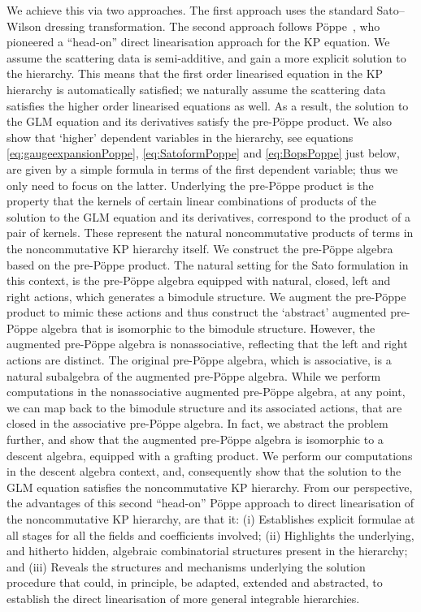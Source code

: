 \documentclass[5p,twocolumn]{elsarticle}
\begin{document}
We achieve this via two approaches. The first approach uses the standard Sato--Wilson dressing transformation.
The second approach follows P\"oppe~\cite{PKP}, who pioneered a ``head-on'' direct linearisation approach for the KP equation.
We assume the scattering data is semi-additive, and gain a more explicit solution to the hierarchy.
This means that the first order linearised equation in the KP hierarchy is automatically satisfied; we naturally assume the scattering data satisfies the higher order linearised equations as well. 
As a result, the solution to the GLM equation and its derivatives satisfy the pre-P\"oppe product.
We also show that `higher' dependent variables in the hierarchy,
see equations \eqref{eq:gaugeexpansionPoppe}, \eqref{eq:SatoformPoppe} and \eqref{eq:BopsPoppe} just below,
are given by a simple formula in terms of the first dependent variable; thus we only need to focus on the latter.
Underlying the pre-P\"oppe product is the property that the kernels of certain linear combinations of products of the solution to the GLM equation and its derivatives,
correspond to the product of a pair of kernels.
These represent the natural noncommutative products of terms in the noncommutative KP hierarchy itself.
We construct the pre-P\"oppe algebra based on the pre-P\"oppe product.
The natural setting for the Sato formulation in this context, is the pre-P\"oppe algebra equipped with natural, closed, left and right actions, which generates a bimodule structure.
We augment the pre-P\"oppe product to mimic these actions and thus construct the `abstract' augmented pre-P\"oppe algebra that is isomorphic to the bimodule structure.
However, the augmented pre-P\"oppe algebra is nonassociative, reflecting that the left and right actions are distinct.
The original pre-P\"oppe algebra, which is associative, is a natural subalgebra of the augmented pre-P\"oppe algebra.
While we perform computations in the nonassociative augmented pre-P\"oppe algebra, at any point, we can map back to the bimodule structure and its associated actions,
that are closed in the associative pre-P\"oppe algebra.
In fact, we abstract the problem further, and show that the augmented pre-P\"oppe algebra is isomorphic to a descent algebra, equipped with a grafting product.
We perform our computations in the descent algebra context, and, consequently show that the solution to the GLM equation satisfies the noncommutative KP hierarchy.
From our perspective, the advantages of this second ``head-on'' P\"oppe approach to direct linearisation of the noncommutative KP hierarchy, are that it:
(i) Establishes explicit formulae at all stages for all the fields and coefficients involved;
(ii) Highlights the underlying, and hitherto hidden, algebraic combinatorial structures present in the hierarchy; and
(iii) Reveals the structures and mechanisms underlying the solution procedure that could, in principle, be adapted, extended and abstracted,
to establish the direct linearisation of more general integrable hierarchies. 
\end{document}
